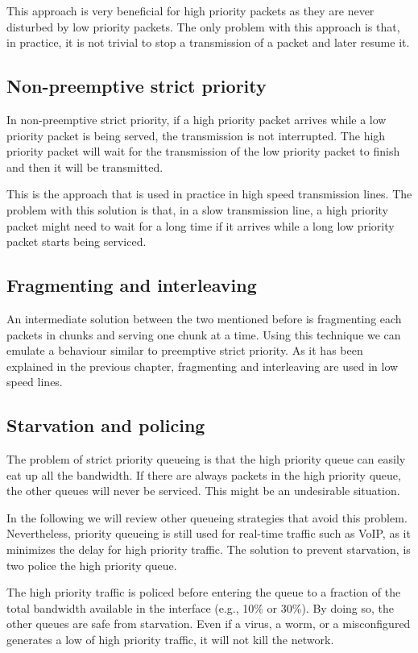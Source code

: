 This approach is very beneficial for high priority packets as they are never disturbed by low priority packets.
The only problem with this approach is that, in practice, it is not trivial to stop a transmission of a packet and later resume it.

\subsection{Non-preemptive strict priority}
In non-preemptive strict priority, if a high priority packet arrives while a low priority packet is being served, the transmission is not interrupted.
The high priority packet will wait for the transmission of the low priority packet to finish and then it will be transmitted.

This is the approach that is used in practice in high speed transmission lines.
The problem with this solution is that, in a slow transmission line, a high priority packet might need to wait for a long time if it arrives while a long low priority packet starts being serviced.

\subsection{Fragmenting and interleaving}
An intermediate solution between the two mentioned before is fragmenting each packets in chunks and serving one chunk at a time. 
Using this technique we can emulate a behaviour similar to preemptive strict priority.
As it has been explained in the previous chapter, fragmenting and interleaving are used in low speed lines.

\subsection{Starvation and policing}
The problem of strict priority queueing is that the high priority queue can easily eat up all the bandwidth.
If there are always packets in the high priority queue, the other queues will never be serviced.
This might be an undesirable situation.

In the following we will review other queueing strategies that avoid this problem.
Nevertheless, priority queueing is still used for real-time traffic such as VoIP, as it minimizes the delay for high priority traffic.
The solution to prevent starvation, is two police the high priority queue.

The high priority traffic is policed before entering the queue to a fraction of the total bandwidth available in the interface (e.g., 10\% or 30\%).
By doing so, the other queues are safe from starvation.
Even if a virus, a worm, or a misconfigured generates a low of high priority traffic, it will not kill the network.

